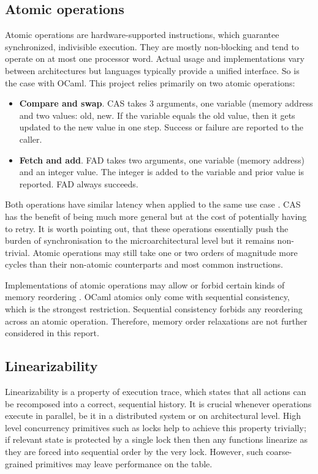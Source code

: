 \documentclass[12pt,a4paper,twoside]{report}
\begin{document}
\subsection{Atomic operations}
Atomic operations are hardware-supported instructions, which guarantee synchronized, indivisible execution. They are mostly non-blocking and tend to operate on at most one processor word. Actual usage and implementations vary between architectures but languages typically provide a unified interface. So is the case with OCaml. This project relies primarily on two atomic operations:
\begin{itemize}
    \item \textbf{Compare and swap}. CAS takes 3 arguments, one variable (memory address and two values: old, new. If the variable equals the old value, then it gets updated to the new value in one step. Success or failure are reported to the caller.  
    \item \textbf{Fetch and add}. FAD takes two arguments, one variable (memory address) and an integer value. The integer is added to the variable and prior value is reported. FAD always succeeds.  
\end{itemize}

Both operations have similar latency when applied to the same use case \cite{fad-cas-speed}. CAS has the benefit of being much more general but at the cost of potentially having to retry. It is worth pointing out, that these operations essentially push the burden of synchronisation to the microarchitectural level but it remains non-trivial. Atomic operations may still take one or two orders of magnitude more cycles than their non-atomic counterparts and most common instructions. 

Implementations of atomic operations may allow or forbid certain kinds of memory reordering \cite{memoryor11:online}. OCaml atomics only come with sequential consistency, which is the strongest restriction. Sequential consistency forbids any reordering across an atomic operation. Therefore, memory order relaxations are not further considered in this report.

\subsection{Linearizability}
\label{section:linearizability}
Linearizability is a property of execution trace, which states that all actions can be recomposed into a correct, sequential history. It is crucial whenever operations execute in parallel, be it in a distributed system or on architectural level. High level concurrency primitives such as locks help to achieve this property trivially; if relevant state is protected by a single lock then then any functions linearize as they are forced into sequential order by the very lock. However, such coarse-grained primitives may leave performance on the table. 
\end{document}
